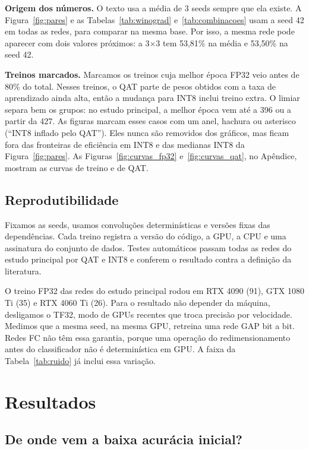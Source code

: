 \documentclass[conference]{IEEEtran}
\newcommand{\by}{\ensuremath{\times}}
\begin{document}
\textbf{Origem dos números.} O texto usa a média de 3 seeds sempre que ela existe. A Figura~\ref{fig:pares} e as Tabelas~\ref{tab:winograd} e~\ref{tab:combinacoes} usam a seed 42 em todas as redes, para comparar na mesma base. Por isso, a mesma rede pode aparecer
com dois valores próximos: a 3\by3 tem 53,81\% na média e 53,50\% na seed 42.

\textbf{Treinos marcados.} Marcamos os treinos cuja melhor época FP32 veio antes de 80\% do total. Nesses treinos, o QAT parte de pesos obtidos com a taxa de aprendizado ainda alta, então a mudança para INT8 inclui treino extra. O limiar
separa bem os grupos: no estudo principal, a melhor época vem até a 396 ou a partir da 427. As figuras marcam esses casos com um anel, hachura ou asterisco (``INT8 inflado pelo QAT''). Eles nunca são removidos dos gráficos, mas ficam fora das fronteiras
de eficiência em INT8 e das medianas INT8 da Figura~\ref{fig:pares}. As Figuras~\ref{fig:curvas_fp32} e~\ref{fig:curvas_qat}, no Apêndice, mostram as curvas de treino e de QAT.

\subsection{Reprodutibilidade}

Fixamos as seeds, usamos convoluções determinísticas e versões fixas das dependências. Cada treino registra a versão do código, a GPU, a CPU e uma assinatura do conjunto de dados. Testes automáticos passam todas as redes do estudo principal por QAT e
INT8 e conferem o resultado contra a definição da literatura.

O treino FP32 das redes do estudo principal rodou em RTX 4090 (91), GTX 1080 Ti (35) e RTX 4060 Ti (26). Para o resultado não depender da máquina, desligamos o TF32, modo de GPUs recentes que troca precisão por velocidade. Medimos que a mesma seed, na mesma GPU, retreina
uma rede GAP bit a bit. Redes FC não têm essa garantia, porque uma operação do redimensionamento antes do classificador não é determinística em GPU. A faixa da Tabela~\ref{tab:ruido} já inclui essa variação.

\section{Resultados}

\subsection{De onde vem a baixa acurácia inicial?}
\label{sec:geometria}
\end{document}
